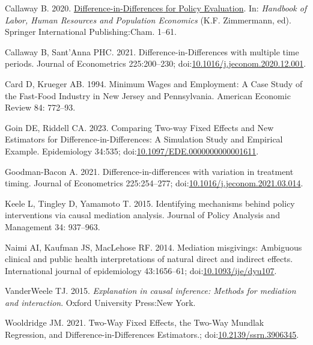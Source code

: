 \documentclass[
  letterpaper,
  DIV=11,
  numbers=noendperiod]{scrartcl}
\newlength{\cslhangindent}
\newenvironment{CSLReferences}[2] %
 {\begin{list}{}{%
  \setlength{\itemindent}{0pt}
  \setlength{\leftmargin}{0pt}
  \setlength{\parsep}{0pt}
  \ifodd #1
   \setlength{\leftmargin}{\cslhangindent}
   \setlength{\itemindent}{-1\cslhangindent}
  \fi
  \setlength{\itemsep}{#2\baselineskip}}}
 {\end{list}}
\begin{document}
\label{refs}
\begin{CSLReferences}{1}{1}
Callaway B. 2020.
\href{https://doi.org/10.1007/978-3-319-57365-6_352-1}{Difference-in-{Differences}
for {Policy Evaluation}}. In: \emph{Handbook of {Labor}, {Human
Resources} and {Population Economics}} (K.F. Zimmermann, ed). {Springer
International Publishing}:{Cham}. 1--61.

Callaway B, Sant'Anna PHC. 2021. Difference-in-{Differences} with
multiple time periods. Journal of Econometrics 225:200--230;
doi:\href{https://doi.org/10.1016/j.jeconom.2020.12.001}{10.1016/j.jeconom.2020.12.001}.

Card D, Krueger AB. 1994. Minimum {Wages} and {Employment}: {A Case
Study} of the {Fast-Food Industry} in {New Jersey} and {Pennsylvania}.
American Economic Review 84: 772--93.

Goin DE, Riddell CA. 2023. Comparing {Two-way Fixed Effects} and {New
Estimators} for {Difference-in-Differences}: {A Simulation Study} and
{Empirical Example}. Epidemiology 34:535;
doi:\href{https://doi.org/10.1097/EDE.0000000000001611}{10.1097/EDE.0000000000001611}.

Goodman-Bacon A. 2021. Difference-in-differences with variation in
treatment timing. Journal of Econometrics 225:254--277;
doi:\href{https://doi.org/10.1016/j.jeconom.2021.03.014}{10.1016/j.jeconom.2021.03.014}.

Keele L, Tingley D, Yamamoto T. 2015. Identifying mechanisms behind
policy interventions via causal mediation analysis. Journal of Policy
Analysis and Management 34: 937--963.

Naimi AI, Kaufman JS, MacLehose RF. 2014. Mediation misgivings:
Ambiguous clinical and public health interpretations of natural direct
and indirect effects. International journal of epidemiology 43:1656--61;
doi:\href{https://doi.org/10.1093/ije/dyu107}{10.1093/ije/dyu107}.

VanderWeele TJ. 2015. \emph{Explanation in causal inference: Methods for
mediation and interaction}. {Oxford University Press}:{New York}.

Wooldridge JM. 2021. Two-{Way Fixed Effects}, the {Two-Way Mundlak
Regression}, and {Difference-in-Differences Estimators}.;
doi:\href{https://doi.org/10.2139/ssrn.3906345}{10.2139/ssrn.3906345}.


\end{CSLReferences}
\end{document}
